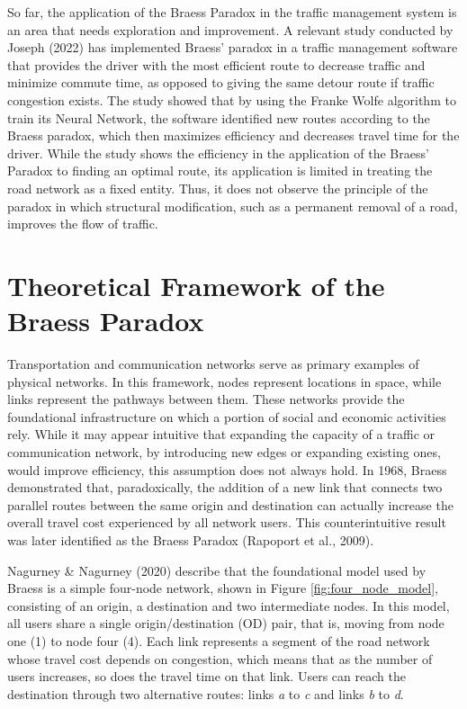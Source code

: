 So far, the application of the Braess Paradox in the traffic management system is an area that needs exploration and improvement. A relevant study conducted by Joseph (2022) has implemented Braess' paradox in a traffic management software that provides the driver with the most efficient route to decrease traffic and minimize commute time, as opposed to giving the same detour route if traffic congestion exists. The study showed that by using the Franke Wolfe algorithm to train its Neural Network, the software identified new routes according to the Braess paradox, which then maximizes efficiency and decreases travel time for the driver. While the study shows the efficiency in the application of the Braess' Paradox to finding an optimal route, its application is limited in treating the road network as a fixed entity. Thus, it does not observe the principle of the paradox in which structural modification, such as a permanent removal of a road, improves the flow of traffic.

\section{Theoretical Framework of the Braess Paradox}
\label{sec:theoretical_bp}

Transportation and communication networks serve as primary examples of physical networks. In this framework, nodes represent locations in space, while links represent the pathways between them. These networks provide the foundational infrastructure on which a portion of social and economic activities rely. While it may appear intuitive that expanding the capacity of a traffic or communication network, by introducing new edges or expanding existing ones, would improve efficiency, this assumption does not always hold. In 1968, Braess demonstrated that, paradoxically, the addition of a new link that connects two parallel routes between the same origin and destination can actually increase the overall travel cost experienced by all network users. This counterintuitive result was later identified as the Braess Paradox (Rapoport et al., 2009).  

Nagurney \& Nagurney (2020) describe that the foundational model used by Braess is a simple four-node network, shown in Figure \ref{fig:four_node_model}, consisting of an origin, a destination and two intermediate nodes. In this model, all users share a single origin/destination (OD) pair, that is, moving from node one (1) to node four (4). Each link represents a segment of the road network whose travel cost depends on congestion, which means that as the number of users increases, so does the travel time on that link. Users can reach the destination through two alternative routes: links \emph{a} to \emph{c} and links \emph{b} to \emph{d}.

